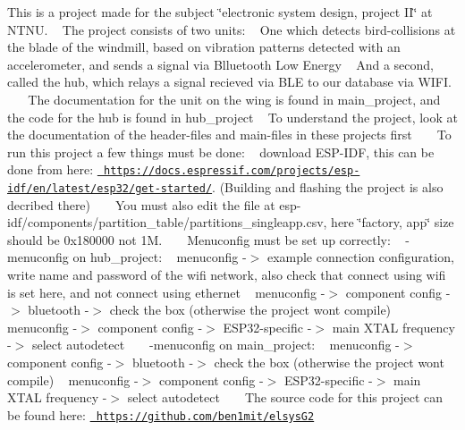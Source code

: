 This is a project made for the subject \char`\"{}electronic system design, project I\+I\char`\"{} at N\+T\+NU. ~\newline
The project consists of two units\+: ~\newline
One which detects bird-\/collisions at the blade of the windmill, based on vibration patterns detected with an accelerometer, and sends a signal via Blluetooth Low Energy ~\newline
And a second, called the hub, which relays a signal recieved via B\+LE to our database via W\+I\+FI. ~\newline
 ~\newline
 The documentation for the unit on the wing is found in main\+\_\+project, and the code for the hub is found in hub\+\_\+project ~\newline
To understand the project, look at the documentation of the header-\/files and main-\/files in these projects first ~\newline
 ~\newline
 To run this project a few things must be done\+: ~\newline
download E\+S\+P-\/\+I\+DF, this can be done from here\+: \href{https://docs.espressif.com/projects/esp-idf/en/latest/esp32/get-started/}{\texttt{ https\+://docs.\+espressif.\+com/projects/esp-\/idf/en/latest/esp32/get-\/started/}}. (Building and flashing the project is also decribed there) ~\newline
 ~\newline
 You must also edit the file at esp-\/idf/components/partition\+\_\+table/partitions\+\_\+singleapp.\+csv, here \char`\"{}factory, app\char`\"{} size should be 0x180000 not 1M. ~\newline
 ~\newline
 Menuconfig must be set up correctly\+: ~\newline
-\/menuconfig on hub\+\_\+project\+: ~\newline
menuconfig -\/$>$ example connection configuration, write name and password of the wifi network, also check that connect using wifi is set here, and not connect using ethernet ~\newline
menuconfig -\/$>$ component config -\/$>$ bluetooth -\/$>$ check the box (otherwise the project wont compile) ~\newline
menuconfig -\/$>$ component config -\/$>$ E\+S\+P32-\/specific -\/$>$ main X\+T\+AL frequency -\/$>$ select autodetect ~\newline
 ~\newline
 -\/menuconfig on main\+\_\+project\+: ~\newline
menuconfig -\/$>$ component config -\/$>$ bluetooth -\/$>$ check the box (otherwise the project wont compile) ~\newline
menuconfig -\/$>$ component config -\/$>$ E\+S\+P32-\/specific -\/$>$ main X\+T\+AL frequency -\/$>$ select autodetect ~\newline
 ~\newline
 The source code for this project can be found here\+: \href{https://github.com/ben1mit/elsysG2}{\texttt{ https\+://github.\+com/ben1mit/elsys\+G2}} ~\newline
